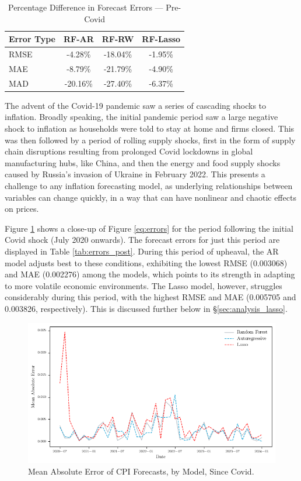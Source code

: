 \begin{table}[H]
\centering
\caption{Percentage Difference in Forecast Errors — Pre-Covid} \label{tab:diff_pre}
\begin{tabular}{lccc}
\toprule
Error Type & RF-AR & RF-RW & RF-Lasso \\
\midrule
RMSE & -4.28\% & -18.04\% & -1.95\% \\
MAE  & -8.79\% & -21.79\% & -4.90\% \\
MAD  & -20.16\% & -27.40\% & -6.37\% \\
\bottomrule
\end{tabular}
\end{table}


The advent of the Covid-19 pandemic saw a series of cascading shocks to inflation. Broadly speaking, the initial pandemic period saw a large negative shock to inflation as households were told to stay at home and firms closed. This was then followed by a period of rolling supply shocks, first in the form of supply chain disruptions resulting from prolonged Covid lockdowns in global manufacturing hubs, like China, and then the energy and food supply shocks caused by Russia's invasion of Ukraine in February 2022. This presents a challenge to any inflation forecasting model, as underlying relationships between variables can change quickly, in a way that can have nonlinear and chaotic effects on prices. 

Figure \ref{fig:errors_covid} shows a close-up of Figure \ref{eq:errors} for the period following the initial Covid shock (July 2020 onwards). The forecast errors for just this period are displayed in Table \ref{tab:errors_post}. During this period of upheaval, the AR model adjusts best to these conditions, exhibiting the lowest RMSE (0.003068) and MAE (0.002276) among the models, which points to its strength in adapting to more volatile economic environments. The Lasso model, however, struggles considerably during this period, with the highest RMSE and MAE (0.005705 and 0.003826, respectively). This is discussed further below in \S \ref{sec:analysis_lasso}. 


\begin{figure}[H]
    \centering
    \includegraphics[width=1\linewidth]{figures/errors_covid.png}
    \vspace{-30pt}
    \caption{Mean Absolute Error of CPI Forecasts, by Model, Since Covid.}
    \label{fig:errors_covid} 
\end{figure}



